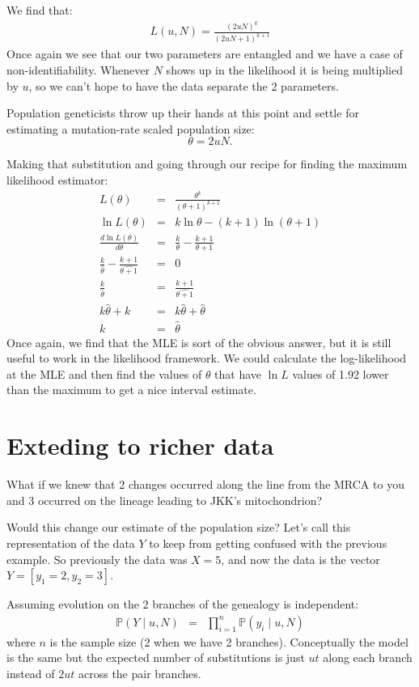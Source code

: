 \documentclass[11pt]{article}
\renewcommand{\Pr}{\mathbb{P}}
\begin{document}
We find that:
\begin{eqnarray}
L(u, N)  = \frac{(2uN)^k}{(2uN + 1)^{k+1}}
\end{eqnarray}
Once again we see that our two parameters are entangled and we have a case of non-identifiability.
Whenever $N$ shows up in the likelihood it is being multiplied by $u$, so we can't hope to 
have the data separate the 2 parameters.

Population geneticists throw up their hands at this point and settle for estimating a mutation-rate scaled population size:
$$\theta = 2uN.$$

Making that substitution and going through our recipe for finding the maximum likelihood estimator:
\begin{eqnarray}
L(\theta)  & = & \frac{\theta^k}{(\theta + 1)^{k+1}} \\
\ln L(\theta)  & = & k\ln\theta - (k+1) \ln(\theta + 1) \\
\frac{d\ln L(\theta)}{d\theta} & = & \frac{k}{\theta} - \frac{k + 1}{\theta + 1} \\
\frac{k}{\hat{\theta}} - \frac{k + 1}{\hat{\theta + 1}} & = & 0 \\ 
\frac{k}{\hat{\theta}} & = &  \frac{k + 1}{\hat{\theta + 1}} \\
k\hat{\theta} + k & = & k\hat{\theta} + \hat{\theta} \\
k & = & \hat{\theta}
\end{eqnarray}
Once again, we find that the MLE is sort of the obvious answer, but it is still
useful to work in the likelihood framework.
We could calculate the log-likelihood at the MLE and then find
the values of $\theta$ that have $\ln L$ values of 1.92 lower than the maximum
to get a nice interval estimate.

\section{Exteding to richer data}
What if we knew that 2 changes occurred along the line from the MRCA to you and 3 occurred 
on the lineage leading to JKK's mitochondrion?

Would this change our estimate of the population size?
Let's call this representation of the data $Y$ to keep from getting confused with the previous
    example.
So previously the data was $X=5$, and now the data is the vector $Y = [y_1=2, y_2=3]$.

Assuming evolution on the 2 branches of the genealogy is independent:
\begin{eqnarray}
\Pr(Y \mid u, N) & = & \prod_{i=1}^{n} \Pr(y_i \mid u, N)
\end{eqnarray}
where $n$ is the sample size (2 when we have 2 branches).
Conceptually the model is the same but the expected number of substitutions
    is just $ut$ along each branch instead of $2ut$ across the pair branches.
\end{document}
